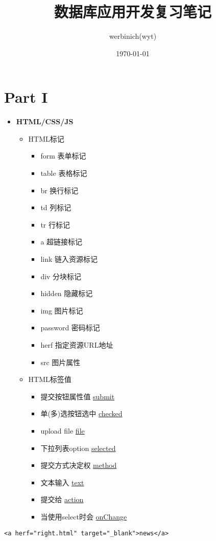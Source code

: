 \documentclass[11pt]{article}
\author{werbinich(wyt)}
\date{\today}
\title{数据库应用开发复习笔记}
\begin{document}
\maketitle
\tableofcontents

\section{Part I}
\label{sec:orgc514395}
\begin{itemize}
\item \textbf{HTML/CSS/JS}
\begin{itemize}
\item HTML标记
\begin{itemize}
\item form     表单标记
\item table    表格标记
\item br       换行标记
\item td       列标记
\item tr       行标记
\item a        超链接标记
\item link     链入资源标记
\item div      分块标记
\item hidden   隐藏标记
\item img      图片标记
\item password 密码标记
\item herf     指定资源URL地址
\item src      图片属性
\end{itemize}
\item HTML标签值
\begin{itemize}
\item 提交按钮属性值      \uline{submit}
\item 单(多)选按钮选中    \uline{checked}
\item upload file       \uline{file}
\item 下拉列表option     \uline{selected}
\item 提交方式决定权      \uline{method}
\item 文本输入           \uline{text}
\item 提交给             \uline{action}
\item 当使用select时会   \uline{onChange}
\end{itemize}
\end{itemize}
\end{itemize}
\begin{verbatim}
<a herf="right.html" target="_blank">news</a>
\end{verbatim}
\end{document}
